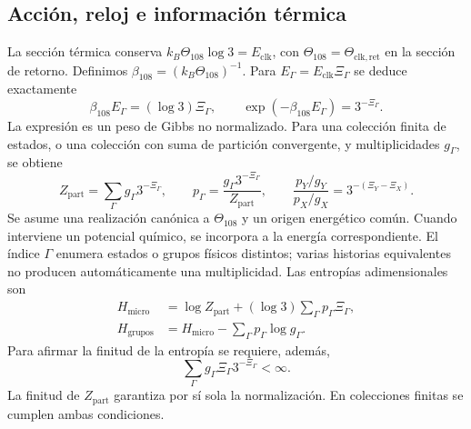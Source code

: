 \subsection{Acción, reloj e información térmica}
\label{md:hib:termica}

La sección térmica conserva
$k_B\Theta_{108}\log3=E_{\mathrm{clk}}$, con
$\Theta_{108}=\Theta_{\mathrm{clk,ret}}$ en la sección de retorno.
Definimos
$\beta_{108}=(k_B\Theta_{108})^{-1}$. Para
$E_\Gamma=E_{\mathrm{clk}}\Xi_\Gamma$ se deduce exactamente
\begin{equation}
 \beta_{108}E_\Gamma=(\log3)\Xi_\Gamma,
 \qquad
 \boxed{\exp(-\beta_{108}E_\Gamma)=3^{-\Xi_\Gamma}.}
 \label{md:hib:peso-termico}
\end{equation}
La expresión es un peso de Gibbs no normalizado. Para una colección finita
de estados, o una colección con suma de partición convergente, y
multiplicidades $g_\Gamma$, se obtiene
\begin{equation}
 Z_{\mathrm{part}}=\sum_\Gamma g_\Gamma3^{-\Xi_\Gamma},\qquad
 p_\Gamma=\frac{g_\Gamma3^{-\Xi_\Gamma}}{Z_{\mathrm{part}}},\qquad
 \frac{p_Y/g_Y}{p_X/g_X}=3^{-(\Xi_Y-\Xi_X)}.
 \label{md:hib:particion}
\end{equation}
Se asume una realización canónica a $\Theta_{108}$ y un origen energético
común. Cuando interviene un potencial químico, se incorpora a la energía
correspondiente. El índice $\Gamma$ enumera estados o grupos físicos
distintos; varias historias equivalentes no producen automáticamente una
multiplicidad. Las entropías adimensionales son
\begin{equation}
 \begin{aligned}
 H_{\mathrm{micro}}
 &=\log Z_{\mathrm{part}}+(\log3)\sum_\Gamma p_\Gamma\Xi_\Gamma,\\
 H_{\mathrm{grupos}}
 &=H_{\mathrm{micro}}-\sum_\Gamma p_\Gamma\log g_\Gamma.
 \end{aligned}
 \label{md:hib:entropias}
\end{equation}
Para afirmar la finitud de la entropía se requiere, además,
\begin{equation}
 \sum_\Gamma g_\Gamma\Xi_\Gamma3^{-\Xi_\Gamma}<\infty.
 \label{md:hib:condicion-entropia}
\end{equation}
La finitud de $Z_{\mathrm{part}}$ garantiza por sí sola la normalización.
En colecciones finitas se cumplen ambas condiciones.

